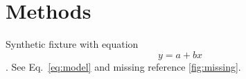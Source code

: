 \section{Methods}\label{sec:methods}
Synthetic fixture with equation \begin{equation} y = a + bx \label{eq:model}\end{equation}.
See Eq.~\eqref{eq:model} and missing reference \ref{fig:missing}. \cite{synthetic2026}
